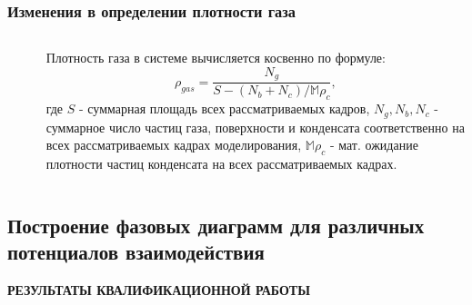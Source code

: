 \documentclass[pdf,hyperref={unicode}]{beamer}
\begin{document}
\begin{frame}
\transdissolve[duration=0.2]
\frametitle{Изменения в определении плотности газа}
\begin{columns}


\begin{column}{0.55\linewidth}
{
\begin{figure}[h]
\end{figure}
}
\end{column}

\begin{column}{0.4\linewidth}
{
\tiny{
Плотность газа в системе вычисляется косвенно по формуле:
\begin{equation}
\rho_{gas} = \frac{N_{g}}{S - (N_{b} + N_{c}) / \mathbb{M}\rho_c},
\label{eqGas}
\end{equation}
где $S$ - суммарная площадь всех рассматриваемых кадров, $N_g, N_b, N_c$ - суммарное число частиц газа, поверхности и конденсата соответственно на всех рассматриваемых кадрах моделирования, $\mathbb{M}\rho_c$ - мат. ожидание плотности частиц конденсата на всех рассматриваемых кадрах.
}
}
\end{column}

\end{columns}
\end{frame}



\subsection{Построение фазовых диаграмм для различных потенциалов взаимодействия}

\begin{frame}
\begin{center}
\vspace{5mm}
\textbf{РЕЗУЛЬТАТЫ КВАЛИФИКАЦИОННОЙ РАБОТЫ}
\end{center}
\end{frame}
\end{document}
